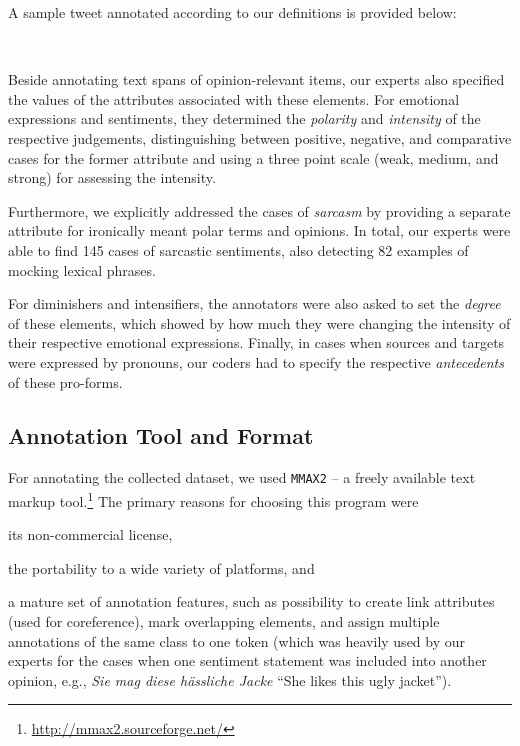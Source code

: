 \noindent{}A sample tweet annotated according to our definitions is
provided below:

{
  \renewcommand{\thesection}{\arabic{section}}
  \begin{example}

    \upshape{}\\[0.8em]
    \noindent{}
  \end{example}
}

Beside annotating text spans of opinion-relevant items, our experts
also specified the values of the attributes associated with these
elements. For emotional expressions and sentiments, they determined
the \emph{polarity} and \emph{intensity} of the respective judgements,
distinguishing between positive, negative, and comparative cases for
the former attribute and using a three point scale (weak, medium, and
strong) for assessing the intensity.

Furthermore, we explicitly addressed the cases of \emph{sarcasm} by
providing a separate attribute for ironically meant polar terms and
opinions.  In total, our experts were able to find 145 cases of
sarcastic sentiments, also detecting 82 examples of mocking lexical
phrases.

For diminishers and intensifiers, the annotators were also asked to
set the \emph{degree} of these elements, which showed by how much they
were changing the intensity of their respective emotional expressions.
Finally, in cases when sources and targets were expressed by pronouns,
our coders had to specify the respective \emph{antecedents} of these
pro-forms.

\subsection{Annotation Tool and Format}\label{subsec:snt:tformat}

For annotating the collected dataset, we used \texttt{MMAX2} -- a
freely available text markup
tool.\footnote{\url{http://mmax2.sourceforge.net/}} The
primary reasons for choosing this program were
\begin{inparaenum}
 \item its non-commercial license,
 \item the portability to a wide variety of platforms, and
 \item a mature set of annotation features, such as possibility to
   create link attributes (used for coreference), mark overlapping
   elements, and assign multiple annotations of the same class to one
   token (which was heavily used by our experts for the cases when one
   sentiment statement was included into another opinion, e.g.,
   \emph{Sie mag diese h\"assliche Jacke} ``She likes this ugly
   jacket'').
\end{inparaenum}

